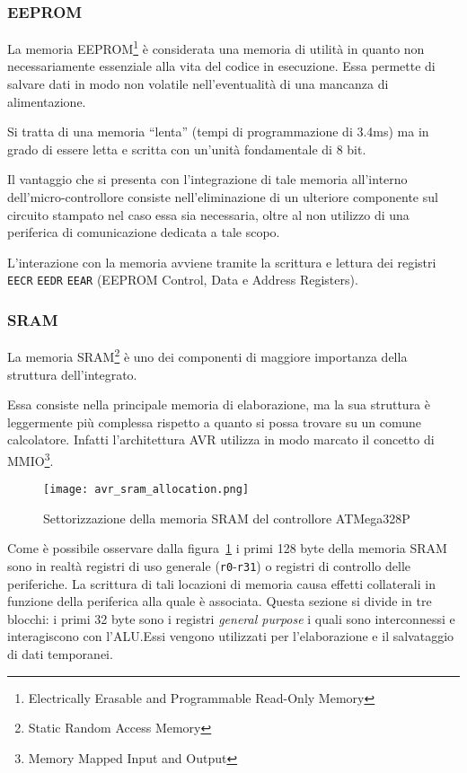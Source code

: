 \subsubsection{EEPROM}

La memoria EEPROM\footnote{Electrically Erasable and Programmable Read-Only Memory} è considerata una memoria di utilità in quanto non necessariamente essenziale alla vita del codice in esecuzione. Essa permette di salvare dati in modo non volatile nell'eventualità di una mancanza di alimentazione.

Si tratta di una memoria ``lenta'' (tempi di programmazione di 3.4ms\cite[tab 8-1]{avr:m328p}) ma in grado di essere letta e scritta con un'unità fondamentale di 8 bit\cite[sec 8.4]{avr:m328p}.

Il vantaggio che si presenta con l'integrazione di tale memoria all'interno dell'micro-controllore consiste nell'eliminazione di un ulteriore componente sul circuito stampato nel caso essa sia necessaria, oltre al non utilizzo di una periferica di comunicazione dedicata a tale scopo.

L'interazione con la memoria avviene tramite la scrittura e lettura dei registri \texttt{EECR} \texttt{EEDR} \texttt{EEAR} (EEPROM Control, Data e Address Registers)\cite[34]{avr:m328p}.

\subsubsection{SRAM}
La memoria SRAM\footnote{Static Random Access Memory} è uno dei componenti di maggiore importanza della struttura dell'integrato.

Essa consiste nella principale memoria di elaborazione, ma la sua struttura è leggermente più complessa rispetto a quanto si possa trovare su un comune calcolatore.
Infatti l'architettura AVR utilizza in modo marcato il concetto di MMIO\footnote{Memory Mapped Input and Output}.

\begin{figure}[b]
    \centering
    \texttt{[image: avr\_sram\_allocation.png]}
    \caption[Immagine ottenuta dal documento~\cite{avr:m328p}, fig. 8-3]{Settorizzazione della memoria SRAM del controllore ATMega328P\cite[fig 8-3]{avr:m328p}}\label{fig:avr-sram-alloc}
\end{figure}

Come è possibile osservare dalla figura~\ref{fig:avr-sram-alloc} i primi 128 byte della memoria SRAM sono in realtà registri di uso generale (\texttt{r0}-\texttt{r31}) o registri di controllo delle periferiche.
La scrittura di tali locazioni di memoria causa effetti collaterali in funzione della periferica alla quale è associata. Questa sezione si divide in tre blocchi: i primi 32 byte sono i registri \textit{general purpose} i quali sono interconnessi e interagiscono con l'ALU.\@ Essi vengono utilizzati per l'elaborazione e il salvataggio di dati temporanei.

